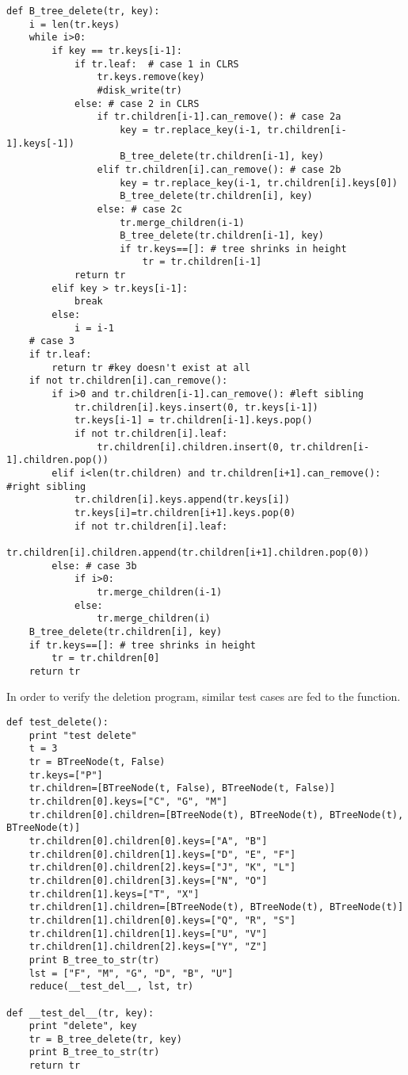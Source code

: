 \documentclass{article}
\begin{document}
\begin{lstlisting}
def B_tree_delete(tr, key):
    i = len(tr.keys)
    while i>0:
        if key == tr.keys[i-1]:
            if tr.leaf:  # case 1 in CLRS
                tr.keys.remove(key)
                #disk_write(tr)
            else: # case 2 in CLRS
                if tr.children[i-1].can_remove(): # case 2a
                    key = tr.replace_key(i-1, tr.children[i-1].keys[-1])
                    B_tree_delete(tr.children[i-1], key)
                elif tr.children[i].can_remove(): # case 2b
                    key = tr.replace_key(i-1, tr.children[i].keys[0])
                    B_tree_delete(tr.children[i], key)
                else: # case 2c
                    tr.merge_children(i-1)
                    B_tree_delete(tr.children[i-1], key)
                    if tr.keys==[]: # tree shrinks in height
                        tr = tr.children[i-1]
            return tr
        elif key > tr.keys[i-1]:
            break
        else:
            i = i-1
    # case 3
    if tr.leaf:
        return tr #key doesn't exist at all
    if not tr.children[i].can_remove():
        if i>0 and tr.children[i-1].can_remove(): #left sibling
            tr.children[i].keys.insert(0, tr.keys[i-1])
            tr.keys[i-1] = tr.children[i-1].keys.pop()
            if not tr.children[i].leaf:
                tr.children[i].children.insert(0, tr.children[i-1].children.pop())
        elif i<len(tr.children) and tr.children[i+1].can_remove(): #right sibling
            tr.children[i].keys.append(tr.keys[i])
            tr.keys[i]=tr.children[i+1].keys.pop(0)
            if not tr.children[i].leaf:
                tr.children[i].children.append(tr.children[i+1].children.pop(0))
        else: # case 3b
            if i>0:
                tr.merge_children(i-1)
            else:
                tr.merge_children(i)
    B_tree_delete(tr.children[i], key)
    if tr.keys==[]: # tree shrinks in height
        tr = tr.children[0]
    return tr
\end{lstlisting}

In order to verify the deletion program, similar test cases are
fed to the function.

\begin{lstlisting}
def test_delete():
    print "test delete"
    t = 3
    tr = BTreeNode(t, False)
    tr.keys=["P"]
    tr.children=[BTreeNode(t, False), BTreeNode(t, False)]
    tr.children[0].keys=["C", "G", "M"]
    tr.children[0].children=[BTreeNode(t), BTreeNode(t), BTreeNode(t), BTreeNode(t)]
    tr.children[0].children[0].keys=["A", "B"]
    tr.children[0].children[1].keys=["D", "E", "F"]
    tr.children[0].children[2].keys=["J", "K", "L"]        
    tr.children[0].children[3].keys=["N", "O"]
    tr.children[1].keys=["T", "X"]
    tr.children[1].children=[BTreeNode(t), BTreeNode(t), BTreeNode(t)]
    tr.children[1].children[0].keys=["Q", "R", "S"]
    tr.children[1].children[1].keys=["U", "V"]
    tr.children[1].children[2].keys=["Y", "Z"]
    print B_tree_to_str(tr)
    lst = ["F", "M", "G", "D", "B", "U"]
    reduce(__test_del__, lst, tr)

def __test_del__(tr, key):
    print "delete", key
    tr = B_tree_delete(tr, key)
    print B_tree_to_str(tr)
    return tr
\end{lstlisting}
\end{document}
